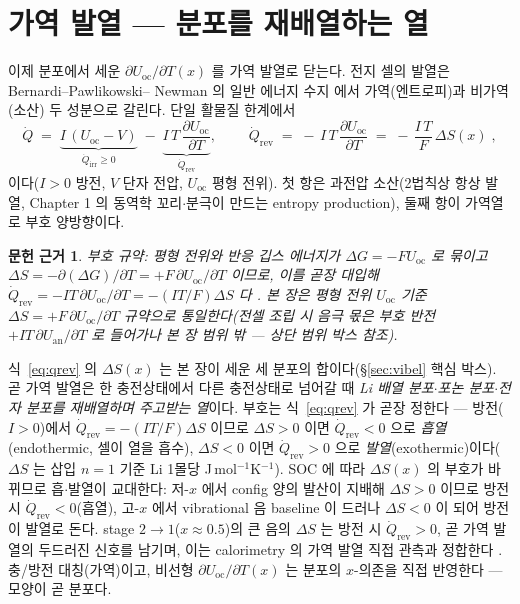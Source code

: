 \documentclass[11pt,a4paper]{article}
\newtheorem*{srcbox}{문헌 근거}
\newcommand{\rev}{\mathrm{rev}}
\newcommand{\irr}{\mathrm{irr}}
\newcommand{\oc}{\mathrm{oc}}
\begin{document}
\section{가역 발열 — 분포를 재배열하는 열}\label{sec:revheat}
이제 분포에서 세운 $\partial U_\oc/\partial T(x)$ 를 가역 발열로 닫는다. 전지 셀의 발열은 Bernardi--Pawlikowski--
Newman 의 일반 에너지 수지 \cite{bernardi1985} 에서 가역(엔트로피)과 비가역(소산) 두 성분으로 갈린다. 단일
활물질 한계에서
\begin{equation}
\dot Q \;=\; \underbrace{I\,(U_\oc-V)}_{\dot Q_\irr\ge0}\;-\;\underbrace{I\,T\,\frac{\partial U_\oc}{\partial T}}_{\dot Q_\rev},
\qquad
\boxed{\;\dot Q_\rev \;=\; -\,I\,T\,\frac{\partial U_\oc}{\partial T}\;=\;-\,\frac{I\,T}{F}\,\Delta S(x)\;,}
\label{eq:qrev}
\end{equation}
이다($I>0$ 방전, $V$ 단자 전압, $U_\oc$ 평형 전위). 첫 항은 과전압 소산(2법칙상 항상 발열, Chapter 1 의
동역학 꼬리$\cdot$분극이 만드는 entropy production), 둘째 항이 가역열로 부호 양방향이다.
\begin{srcbox}
부호 규약: 평형 전위와 반응 깁스 에너지가 $\Delta G=-FU_\oc$ 로 묶이고 $\Delta S=-\partial(\Delta G)/\partial T
=+F\,\partial U_\oc/\partial T$ 이므로, 이를 곧장 대입해 $\dot Q_\rev=-IT\,\partial U_\oc/\partial T=-(IT/F)\Delta S$
다 \cite{newman,msmr_partI}. 본 장은 평형 전위 $U_\oc$ 기준 $\Delta S=+F\,\partial U_\oc/\partial T$ 규약으로 통일한다(전셀 조립 시 음극 몫은 부호 반전 $+IT\,\partial U_\mathrm{an}/\partial T$ 로 들어가나 본 장 범위 밖 — 상단 범위 박스 참조).
\end{srcbox}

식~\eqref{eq:qrev} 의 $\Delta S(x)$ 는 본 장이 세운 세 분포의 합이다(\S\ref{sec:vibel} 핵심 박스). 곧 가역
발열은 한 충전상태에서 다른 충전상태로 넘어갈 때 \emph{Li 배열 분포$\cdot$포논 분포$\cdot$전자 분포를 재배열하며
주고받는 열}이다. 부호는 식~\eqref{eq:qrev} 가 곧장 정한다 — 방전($I>0$)에서 $\dot Q_\rev=-(IT/F)\Delta S$
이므로 $\Delta S>0$ 이면 $\dot Q_\rev<0$ 으로 \emph{흡열}(endothermic, 셀이 열을 흡수), $\Delta S<0$ 이면
$\dot Q_\rev>0$ 으로 \emph{발열}(exothermic)이다($\Delta S$ 는 삽입 $n=1$ 기준 Li 1몰당
J\,mol$^{-1}$K$^{-1}$). SOC 에 따라 $\Delta S(x)$ 의 부호가 바뀌므로 흡$\cdot$발열이 교대한다: 저-$x$ 에서
config 양의 발산이 지배해 $\Delta S>0$ 이므로 방전 시 $\dot Q_\rev<0$(흡열), 고-$x$ 에서 vibrational 음
baseline 이 드러나 $\Delta S<0$ 이 되어 방전이 발열로 돈다. stage $2\to1$($x\approx0.5$)의 큰 음의 $\Delta S$
는 방전 시 $\dot Q_\rev>0$, 곧 가역 발열의 두드러진 신호를 남기며, 이는 calorimetry 의 가역 발열 직접 관측과
정합한다 \cite{standardised2024}. 충/방전 대칭(가역)이고, 비선형 $\partial U_\oc/\partial T(x)$ 는 분포의
$x$-의존을 직접 반영한다 — 모양이 곧 분포다.
\end{document}
